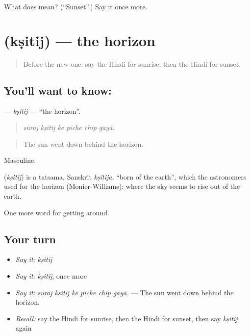 \begin{tcolorbox}[breakable,colback=teal!4,colframe=teal!35!black,title={Before you move on}]
What does  mean? (\textquotedblleft{}Sunset\textquotedblright{}.) Say it once more.
\end{tcolorbox}
\section[\texorpdfstring{\hi{क्षितिज} (kṣitij)}{क्षितिज (kṣitij)}]{ (kṣitij) — the horizon}

\label{lesson:HI-C441-ksitij}



\begin{quote}
Before the new one: say the Hindi for sunrise, then the Hindi for sunset.
\end{quote}

\subsection*{You'll want to know: }
\textbf{} — \emph{kṣitij} — \textquotedblleft{}the horizon\textquotedblright{}.

\begin{quote}
     
\end{quote}

\begin{quote}
\emph{sūraj kṣitij ke pīche chip gayā.}
\end{quote}

\begin{quote}
The sun went down behind the horizon.
\end{quote}

Masculine.

\begin{cousinweb}
\textbf{} (\emph{kṣitij}) is a tatsama, Sanskrit \emph{kṣitija}, \textquotedblleft{}born of the earth\textquotedblright{}, which the astronomers used for the horizon (Monier-Williams): where the sky seems to rise out of the earth.
\end{cousinweb}

\begin{grammarlens}[title={What you've built}]
One more word for getting around.
\end{grammarlens}

\subsection*{Your turn}
\begin{itemize}
\raggedright
  \item \emph{Say it:} \emph{kṣitij}
  \item \emph{Say it:} \emph{kṣitij}, once more
  \item \emph{Say it:} \emph{sūraj kṣitij ke pīche chip gayā.} — The sun went down behind the horizon.
  \item \emph{Recall:} say the Hindi for sunrise, then the Hindi for sunset, then say \emph{kṣitij} again
\end{itemize}

